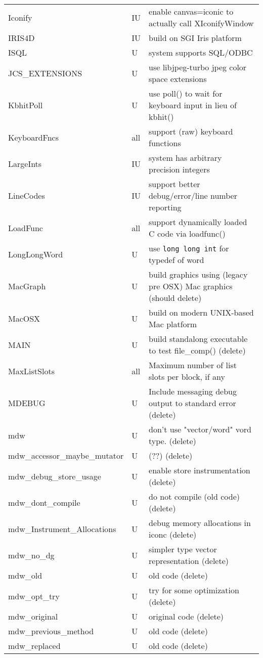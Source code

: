 \begin{xtabular}{|m{1.8in}|m{0.5in}|m{4.0in}|}
Iconify & IU & enable canvas=iconic to actually call XIconifyWindow \\
IRIS4D & IU & build on SGI Iris platform \\
ISQL & U & system supports SQL/ODBC \\
JCS\_EXTENSIONS & U & use libjpeg-turbo jpeg color space extensions \\
KbhitPoll & U & use poll() to wait for keyboard input in lieu of kbhit() \\
KeyboardFncs & all & support (raw) keyboard functions \\
LargeInts & IU & system has arbitrary precision integers \\
LineCodes & IU & support better debug/error/line number reporting \\
LoadFunc & all & support dynamically loaded C code via loadfunc() \\
LongLongWord & U & use \texttt{long long int} for typedef of word \\
MacGraph & U & build graphics using (legacy pre OSX) Mac graphics (should delete)  \\
MacOSX & U & build on modern UNIX-based Mac platform \\
MAIN & U & build standalong executable to test file\_comp() (delete) \\
MaxListSlots & all & Maximum number of list slots per block, if any \\
MDEBUG & U & Include messaging debug output to standard error (delete) \\
mdw & U & don't use "vector/word" vord type. (delete) \\
mdw\_accessor\_maybe\_mutator & U & (??) (delete) \\
mdw\_debug\_store\_usage & U & enable store instrumentation (delete) \\
mdw\_dont\_compile & U & do not compile (old code) (delete) \\
mdw\_Instrument\_Allocations & U & debug memory allocations in iconc (delete) \\
mdw\_no\_dg & U & simpler type vector representation (delete) \\
mdw\_old & U & old code (delete) \\
mdw\_opt\_try & U & try for some optimization (delete) \\
mdw\_original & U & original code (delete) \\
mdw\_previous\_method & U & old code (delete) \\
mdw\_replaced & U & old code (delete) \\

\end{xtabular}
